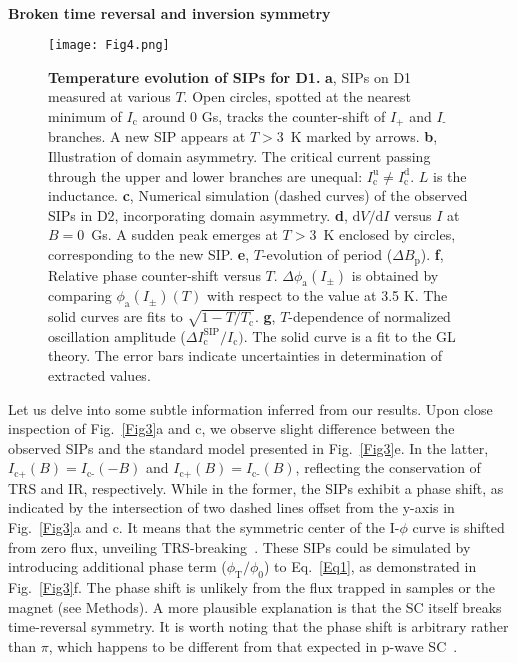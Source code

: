 \documentclass[article,reprint,amsmath,amssymb,superscriptaddress,longbibliography]{revtex4-1}
\begin{document}
~\\
\noindent\textbf{Broken time reversal and inversion symmetry}

\begin{figure*}[thb]
	\begin{center}
		\texttt{[image: Fig4.png]}
	\end{center}
	\setlength{\abovecaptionskip}{-8 pt}
	\caption{\textbf{Temperature evolution of SIPs for D1.} \textbf{a}, SIPs on D1 measured at various $T$. Open circles, spotted at the nearest minimum of $I_\textrm{c}$ around 0 Gs, tracks the counter-shift of $I_\textrm{+}$ and $I_\textrm{-}$ branches.  A new SIP appears at $T>3$~K marked by arrows. \textbf{b}, Illustration of domain asymmetry. The critical current passing through the upper and lower branches are unequal: $I^\textrm{u}_\textrm{c}\neq I^\textrm{d}_\textrm{c}$. $L$ is the inductance. \textbf{c}, Numerical simulation (dashed curves) of the observed SIPs in D2, incorporating domain asymmetry. \textbf{d}, $\textrm{d}V/\textrm{d}I$ versus $I$ at $B=0$~Gs. A sudden peak emerges at $T>3$~K enclosed by circles, corresponding to the new SIP.  \textbf{e}, $T$-evolution of period ($\Delta B_\textrm{p}$). \textbf{f}, Relative phase counter-shift versus $T$. $\Delta \phi_\textrm{a}(I_\pm)$ is obtained by comparing $\phi_\textrm{a}(I_\pm)(T)$ with respect to the value at 3.5 K. The solid curves are fits to $\sqrt{1-T/T_\textrm{c}}$. \textbf{g}, $T$-dependence of normalized oscillation amplitude ($\Delta I^\textrm{SIP}_\textrm{c}/I_\textrm{c})$.  The solid curve is a fit to the GL theory. The error bars indicate uncertainties in  determination of extracted values.
	}
	\label{Fig4}
\end{figure*}

\noindent
Let us delve into some subtle information inferred from our results. Upon close inspection of Fig.~\ref{Fig3}a and c, we observe slight difference between the observed SIPs and the standard model presented in Fig.~\ref{Fig3}e. In the latter, $I_\text{c+}(B)=I_\text{c-}(-B)$ and $I_\text{c+}(B)=I_\text{c-}(B)$, reflecting the conservation of TRS and IR, respectively. While in the former, the SIPs exhibit a phase shift, as indicated by the intersection of two dashed lines offset from the y-axis in Fig.~\ref{Fig3}a and c. It means that the symmetric center of the I-$\phi$ curve is shifted from zero flux,
unveiling TRS-breaking~\cite{WuCJ2022Arxiv}. These SIPs could be simulated by introducing additional phase term ($\phi_\textrm{T}/\phi_0$) to Eq.~\ref{Eq1}, as demonstrated in Fig.~\ref{Fig3}f. The phase shift is unlikely from the flux trapped in samples or the magnet (see Methods). A more plausible explanation is that the SC itself breaks time-reversal symmetry. 
It is worth noting that the phase shift is arbitrary rather than $\pi$, which happens to be different from that expected in p-wave SC~\cite{DuanXF2023arxiv}.
\end{document}
